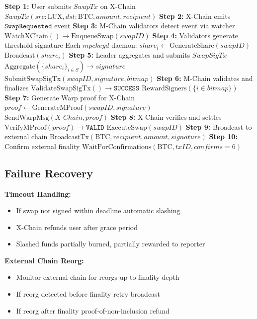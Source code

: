\documentclass[11pt]{article}
\begin{document}
\begin{algorithmic}[1]
\State \textbf{Step 1:} User submits $SwapTx$ on X-Chain
\State \quad $SwapTx(src: \text{LUX}, dst: \text{BTC}, amount, recipient)$
\State
\State \textbf{Step 2:} X-Chain emits $\texttt{SwapRequested}$ event
\State
\State \textbf{Step 3:} M-Chain validators detect event via watcher
\State \quad $\text{WatchXChain}() \rightarrow \text{EnqueueSwap}(swapID)$
\State
\State \textbf{Step 4:} Validators generate threshold signature
\State \quad Each $mpckeyd$ daemon:
\State \quad \quad $share_i \gets \text{GenerateShare}(swapID)$
\State \quad \quad $\text{Broadcast}(share_i)$
\State
\State \textbf{Step 5:} Leader aggregates and submits $SwapSigTx$
\State \quad $\text{Aggregate}(\{share_i\}_{i \in S}) \rightarrow signature$
\State \quad $\text{SubmitSwapSigTx}(swapID, signature, bitmap)$
\State
\State \textbf{Step 6:} M-Chain validates and finalizes
\State \quad $\text{ValidateSwapSigTx}() \rightarrow \texttt{SUCCESS}$
\State \quad $\text{RewardSigners}(\{i \in bitmap\})$
\State
\State \textbf{Step 7:} Generate Warp proof for X-Chain
\State \quad $proof \gets \text{GenerateMProof}(swapID, signature)$
\State \quad $\text{SendWarpMsg}(X\text{-}Chain, proof)$
\State
\State \textbf{Step 8:} X-Chain verifies and settles
\State \quad $\text{VerifyMProof}(proof) \rightarrow \texttt{VALID}$
\State \quad $\text{ExecuteSwap}(swapID)$ 
\State
\State \textbf{Step 9:} Broadcast to external chain
\State \quad $\text{BroadcastTx}(\text{BTC}, recipient, amount, signature)$
\State
\State \textbf{Step 10:} Confirm external finality
\State \quad $\text{WaitForConfirmations}(\text{BTC}, txID, confirms = 6)$
\end{algorithmic}


\subsection{Failure Recovery}

\textbf{Timeout Handling:}
\begin{itemize}
\item If swap not signed within deadline \rightarrow{} automatic slashing
\item X-Chain refunds user after grace period
\item Slashed funds partially burned, partially rewarded to reporter
\end{itemize}

\textbf{External Chain Reorg:}
\begin{itemize}
\item Monitor external chain for reorgs up to finality depth
\item If reorg detected before finality \rightarrow{} retry broadcast
\item If reorg after finality \rightarrow{} proof-of-non-inclusion refund
\end{itemize}
\end{document}
